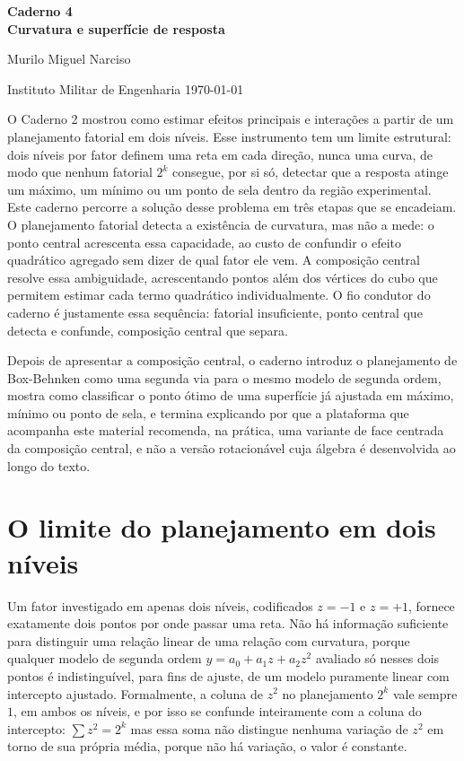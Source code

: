 \documentclass{doeapostila}
\begin{document}
\begin{center}
  {\large\bfseries Caderno 4\\Curvatura e superfície de resposta}\par\smallskip
  {\normalsize Murilo Miguel Narciso}\par\smallskip
  {\footnotesize Instituto Militar de Engenharia \textbullet{} \today}
\end{center}

\vspace{0.6\baselineskip}

\noindent
O Caderno 2 mostrou como estimar efeitos principais e interações a partir de
um planejamento fatorial em dois níveis. Esse instrumento tem um limite
estrutural: dois níveis por fator definem uma reta em cada direção, nunca uma
curva, de modo que nenhum fatorial $2^{k}$ consegue, por si só, detectar que a
resposta atinge um máximo, um mínimo ou um ponto de sela dentro da região
experimental. Este caderno percorre a solução desse problema em três etapas
que se encadeiam. O planejamento fatorial detecta a existência de curvatura,
mas não a mede: o ponto central acrescenta essa capacidade, ao custo de
confundir o efeito quadrático agregado sem dizer de qual fator ele vem. A
composição central resolve essa ambiguidade, acrescentando pontos além dos
vértices do cubo que permitem estimar cada termo quadrático individualmente.
O fio condutor do caderno é justamente essa sequência: fatorial insuficiente,
ponto central que detecta e confunde, composição central que separa.

Depois de apresentar a composição central, o caderno introduz o
planejamento de Box-Behnken como uma segunda via para o mesmo modelo de
segunda ordem, mostra como classificar o ponto ótimo de uma superfície já
ajustada em máximo, mínimo ou ponto de sela, e termina explicando por que a
plataforma que acompanha este material recomenda, na prática, uma variante
de face centrada da composição central, e não a versão rotacionável cuja
álgebra é desenvolvida ao longo do texto.

\vspace{0.6\baselineskip}

\tableofcontents

\section{O limite do planejamento em dois níveis}

Um fator investigado em apenas dois níveis, codificados $z=-1$ e $z=+1$,
fornece exatamente dois pontos por onde passar uma reta. Não há informação
suficiente para distinguir uma relação linear de uma relação com curvatura,
porque qualquer modelo de segunda ordem $y = a_{0} + a_{1}z + a_{2}z^{2}$
avaliado só nesses dois pontos é indistinguível, para fins de ajuste, de um
modelo puramente linear com intercepto ajustado. Formalmente, a coluna de
$z^{2}$ no planejamento $2^{k}$ vale sempre $1$, em ambos os níveis, e por
isso se confunde inteiramente com a coluna do intercepto: $\sum z^{2} = 2^{k}$
mas essa soma não distingue nenhuma variação de $z^{2}$ em torno de sua
própria média, porque não há variação, o valor é constante.
\end{document}
